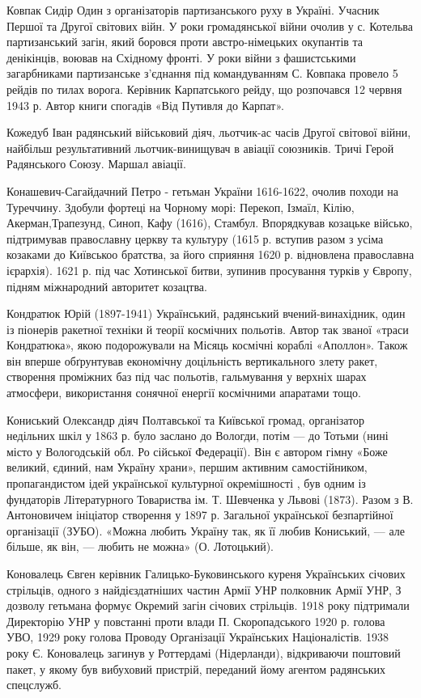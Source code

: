 Ковпак Сидір Один з організаторів партизанського руху в Україні. Учасник Першої та Другої світових війн. У роки громадянської війни очолив у с. Котельва партизанський загін, який боровся проти австро-німецьких окупантів та денікінців, воював на Східному фронті. У роки війни з фашистськими загарбниками партизанське з'єднання під командуванням С. Ковпака провело 5 рейдів по тилах ворога. Керівник Карпатського рейду, що розпочався 12 червня 1943 р. Автор книги спогадів «Від Путивля до Карпат». 

Кожедуб Іван радянський військовий діяч, льотчик-ас часів Другої світової війни, найбільш результативний льотчик-винищувач в авіації союзників. Тричі Герой Радянського Союзу. Маршал авіації.

Конашевич-Сагайдачний Петро  - гетьман України 1616-1622, очолив походи на Туреччину. Здобули фортеці на Чорному морі: Перекоп, Ізмаїл, Кілію, Акерман,Трапезунд, Синоп, Кафу (1616), Стамбул. Впорядкував козацьке військо, підтримував православну церкву та культуру (1615 р. вступив разом з усіма козаками до Київськоо братства, за його сприяння 1620 р. відновлена православна ієрархія). 1621 р. під час Хотинської битви, зупинив просування турків у Європу, підням міжнародний авторитет козацтва.

Кондратюк Юрій (1897-1941) Український, радянський вчений-винахідник, один із піонерів ракетної техніки й теорії космічних польотів. Автор так званої «траси Кондратюка», якою подорожували на Місяць космічні кораблі «Аполлон». Також він вперше обґрунтував економічну доцільність вертикального злету ракет, створення проміжних баз під час польотів, гальмування у верхніх шарах атмосфери, використання сонячної енергії космічними апаратами тощо.

Кониський Олександр  діяч Полтавської та Київської громад, організатор недільних шкіл у 1863 р. було заслано до Вологди, потім --- до Тотьми (нині місто у Вологодській обл. Ро сійської Федерації). Він є автором гімну «Боже великий, єдиний, нам Україну храни», першим активним самостійником, пропагандистом ідей української культурної окремішності , був одним із фундаторів Літературного Товариства ім. Т. Шевченка у Львові (1873). Разом з  В. Антоновичем ініціатор створення у 1897 р.  Загальної української безпартійної організації (ЗУБО). «Можна любить Україну так, як її любив Кониський, --- але більше, як він, --- любить не можна» (О. Лотоцький).

Коновалець Євген керівник Галицько-Буковинського куреня Українських січових стрільців, одного з найдієздатніших частин Армії УНР полковник Армії УНР, З дозволу гетьмана формує Окремий загін січових стрільців. 1918 року підтримали Директорію УНР у повстанні проти влади П. Скоропадського 1920 р. голова УВО, 1929 року голова Проводу Організації Українських Націоналістів. 1938 року Є. Коновалець загинув у Роттердамі (Нідерланди), відкриваючи поштовий пакет, у якому був вибуховий пристрій, переданий йому агентом радянських спецслужб. 

